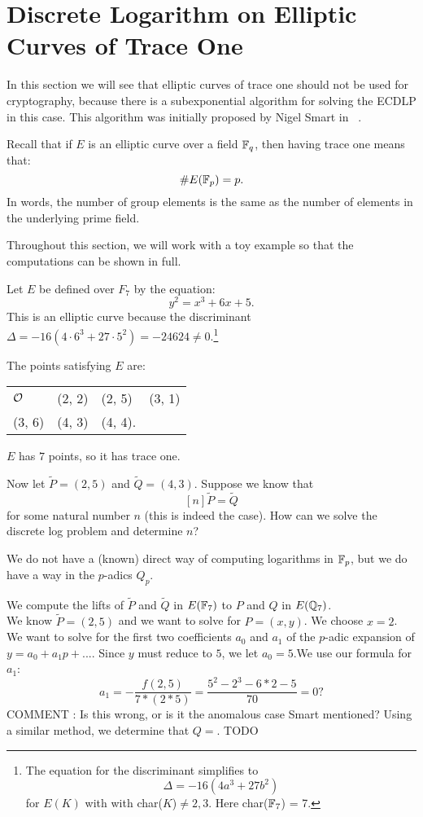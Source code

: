 \chapter{Discrete Logarithm on Elliptic Curves of Trace One}
\label{sec:trace-one}

In this section we will see that elliptic curves of trace one should not be used for cryptography, because there is a subexponential algorithm
for solving the ECDLP in this case. This algorithm was initially proposed by Nigel Smart in ~\cite{smart}.

Recall that if $E$ is an elliptic curve over a field $\mathbb{F}_q$, then having trace one means that:
$$ \#E(\mathbb{F}_p) = p.$$
In words, the number of group elements is the same as the number of elements in the
underlying prime field.

Throughout this section, we will work with a toy example so that the computations can be
shown in full. 

\begin{ex}[Setup]

Let $E$ be defined over $F_7$ by the equation:
$$ y^2 = x^3 + 6x + 5.$$
This is an elliptic curve because the discriminant $\Delta = -16 (4 \cdot 6^3 + 27 \cdot 5^2) = -24624 \neq 0.$\footnote{The equation for the discriminant simplifies to
$$\Delta = -16(4a^3 + 27b^2)$$
for $E(K)$ with with char($K$)$\neq 2, 3$. Here char($\mathbb{F}_7$) = 7.} 

\pagebreak

The points satisfying $E$ are:

\begin{table}[h]
\centering
\begin{tabular}{llll}
$\mathcal{O}$     & (2, 2) & (2, 5) & (3, 1) \\
(3, 6) & (4, 3) & (4, 4). &        
\end{tabular}
\end{table}
$E$ has $7$ points, so it has trace one.

Now let $\tilde{P} = (2, 5)$ and $\tilde{Q} = (4, 3)$. Suppose we know that
$$ [n]\tilde{P} = \tilde{Q} $$
for some natural number $n$ (this is indeed the case). How can we solve the discrete log problem and determine $n$?
\end{ex}

We do not have a (known) direct way of computing logarithms in $\mathbb{F}_p$, but we do have a way in the $p$-adics $Q_p$.

\begin{ex}
We compute the lifts of $\tilde{P}$ and $\tilde{Q}$ in $E(\mathbb{F}_7)$ to $P$ and $Q$  in $E(\mathbb{Q}_7)$. \\
We know $\tilde{P} = (2, 5)$ and we want to solve for $P = (x, y)$.
We choose $x = 2$. We want to solve for the first two coefficients $a_0$ and $a_1$ of the $p$-adic expansion of $y = a_0 + a_1p + ...$. Since $y$ must reduce
to $5$, we let $a_0 = 5$.We use our formula for $a_1$:
$$ a_1 = -\frac{f(2, 5)}{7 * (2*5)} = \frac{5^2 - 2^3 - 6*2- 5}{70} = 0 ? $$
COMMENT : Is this wrong, or is it the anomalous case Smart mentioned?
Using a similar method, we determine that $Q = $. TODO
\end{ex}

